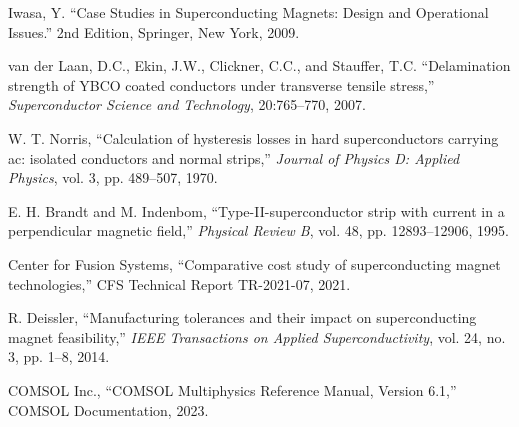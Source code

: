 \documentclass[10pt,twocolumn]{article}
\begin{document}
\begin{thebibliography}{8}
Iwasa, Y. ``Case Studies in Superconducting Magnets: Design and Operational Issues.'' 2nd Edition, Springer, New York, 2009.

van der Laan, D.C., Ekin, J.W., Clickner, C.C., and Stauffer, T.C. ``Delamination strength of YBCO coated conductors under transverse tensile stress,'' \textit{Superconductor Science and Technology}, 20:765--770, 2007.

W. T. Norris, ``Calculation of hysteresis losses in hard superconductors carrying ac: isolated conductors and normal strips,'' \textit{Journal of Physics D: Applied Physics}, vol. 3, pp. 489--507, 1970.

E. H. Brandt and M. Indenbom, ``Type-II-superconductor strip with current in a perpendicular magnetic field,'' \textit{Physical Review B}, vol. 48, pp. 12893--12906, 1995.

Center for Fusion Systems, ``Comparative cost study of superconducting magnet technologies,'' CFS Technical Report TR-2021-07, 2021.

R. Deissler, ``Manufacturing tolerances and their impact on superconducting magnet feasibility,'' \textit{IEEE Transactions on Applied Superconductivity}, vol. 24, no. 3, pp. 1--8, 2014.

COMSOL Inc., ``COMSOL Multiphysics Reference Manual, Version 6.1,'' COMSOL Documentation, 2023.

\end{thebibliography}
\end{document}
